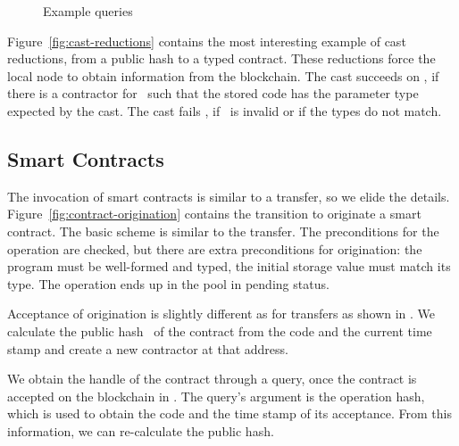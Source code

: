 \documentclass[runningheads]{llncs}
\begin{document}
\begin{figure}[tp]
  \begin{mathpar}

  \end{mathpar}
  \caption{Example queries}
  \label{fig:example-queries}
\end{figure}


Figure~\ref{fig:cast-reductions} contains the most interesting
example of cast reductions, from a public hash to a typed
contract. These reductions force the local node to obtain information
from the blockchain. The cast succeeds  on \PUH, if there is a
contractor for \PUH\ such that the stored code has the parameter type
expected by the cast. The cast fails , if \PUH\
is invalid or if the types do not match.




\subsection{Smart Contracts}
\label{sec:smart-contracts}

The invocation of smart contracts is similar to a transfer, so we
elide the details. Figure~\ref{fig:contract-origination} contains the
transition \TirName{Block-Originate} to originate a smart contract. The basic scheme is similar
to the transfer. The preconditions for the operation are checked, but
there are extra preconditions for origination:  the program must be
well-formed and typed, the initial storage value must match its
type. The operation ends up in the pool in pending status.

Acceptance of origination is slightly different as for transfers as
shown in \TirName{Block-Accept}. We calculate the public hash \PUH\ of the
contract from the code and the current time stamp and create a new
contractor at that address.  

We obtain the handle of the contract through a query, once the
contract is accepted on the blockchain in
. The query's argument is the operation
hash, which is used to obtain the code and the time stamp of its
acceptance. From this information, we can re-calculate the public
hash. 
\end{document}

